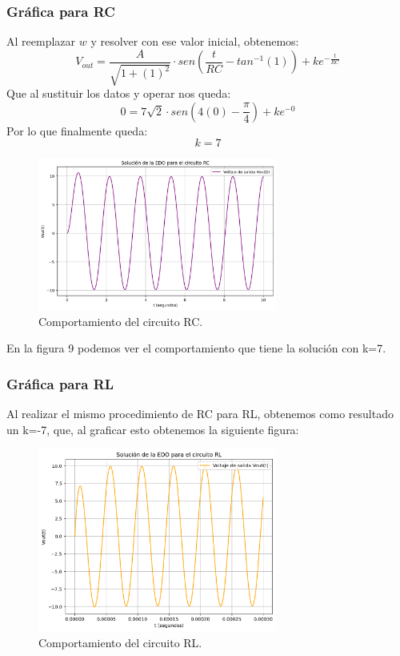\documentclass{article}
\begin{document}
\subsubsection{Gráfica para RC}
 Al reemplazar \(w\) y resolver con ese valor inicial, obtenemos:
\[
    V_{out}=\frac{A}{\sqrt{1+(1)^2}}\cdot sen(\frac{t}{RC}-tan^{-1}(1))+ke^{-\frac{t}{RC}}
\]
Que al sustituir los datos y operar nos queda:
\[
    0=7\sqrt{2}\cdot sen(4(0)-\frac{\pi}{4})+ke^{-0}
\]
Por lo que finalmente queda:
\[
    k=7
\]
\begin{figure}[H]
    \centering
    \includegraphics[width=0.7\textwidth]{Grafica_VoutRC.png}
    \caption{Comportamiento del circuito RC.}
    \label{fig:cRC}
\end{figure}
En la figura 9 podemos ver el comportamiento que tiene la solución con k=7.
\subsubsection{Gráfica para RL}
Al realizar el mismo procedimiento de RC para RL, obtenemos como resultado un k=-7, que, al graficar esto obtenemos la siguiente figura:
\begin{figure}[H]
    \centering
    \includegraphics[width=0.7\textwidth]{Grafica_VoutRL.png}
    \caption{Comportamiento del circuito RL.}
    \label{fig:cRL}
\end{figure}
\end{document}

